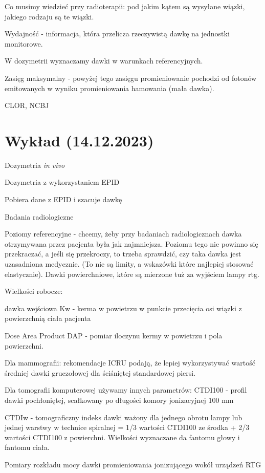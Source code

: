 \documentclass{article}
\begin{document}
Co musimy wiedzieć przy radioterapii: pod jakim kątem są wysyłane wiązki, jakiego rodzaju są te wiązki.

Wydajność - informacja, która przelicza rzeczywistą dawkę na jednostki monitorowe.

W dozymetrii wyznaczamy dawki w warunkach referencyjnych.

Zasięg maksymalny - powyżej tego zasięgu promieniowanie pochodzi od fotonów emitowanych w wyniku promieniowania hamowania (mała dawka).

CLOR, NCBJ

\section{Wykład (14.12.2023)}

Dozymetria \textit{in vivo}

Dozymetria z wykorzystaniem EPID

Pobiera dane z EPID i szacuje dawkę

Badania radiologiczne

Poziomy referencyjne - chcemy, żeby przy badaniach radiologicznach dawka otrzymywana przez pacjenta była jak najmniejsza. Poziomu tego nie powinno się przekraczać, a jeśli się przekroczy, to trzeba sprawdzić, czy taka dawka jest uzasadniona medycznie. (To nie są limity, a wskazówki które najlepiej stosować elastycznie). Dawki powierchniowe, które są mierzone tuż za wyjściem lampy rtg.

Wielkości robocze:

dawka wejściowa Kw - kerma w powietrzu w punkcie przecięcia osi wiązki z powierzchnią ciała pacjenta

Dose Area Product DAP - pomiar iloczynu kermy w powietrzu i pola powierzchni.

Dla mammografii: rekomendacje ICRU podają, że lepiej wykorzystywać wartość średniej dawki gruczołowej dla ściśniętej standardowej piersi.

Dla tomografii komputerowej używamy innych parametrów: CTDI100 - profil dawki pochłoniętej, scałkowany po długości komory jonizacyjnej 100 mm

CTDIw - tomograficzny indeks dawki ważony dla jednego obrotu lampy lub jednej warstwy w technice spiralnej = 1\slash 3 wartości CTDI100 ze środka + 2\slash 3 wartości CTDI100 z powierchni. Wielkości wyznaczane da fantomu głowy i fantomu ciała.

Pomiary rozkładu mocy dawki promieniowania jonizującego wokół urządzeń RTG
\end{document}
